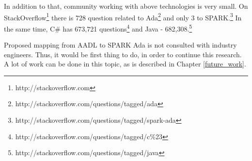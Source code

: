 In addition to that, community working with above technologies is very small. On StackOverflow\footnote{http://stackoverflow.com} there is 728 question related to Ada\footnote{http://stackoverflow.com/questions/tagged/ada} and only 3 to SPARK.\footnote{http://stackoverflow.com/questions/tagged/spark-ada} In the same time, C\# has 673,721 questions\footnote{http://stackoverflow.com/questions/tagged/c\%23} and Java - 682,308.\footnote{http://stackoverflow.com/questions/tagged/java}

Proposed mapping from AADL to SPARK Ada is not consulted with industry engineers. Thus, it would be first thing to do, in order to continue this research. A lot of work can be done in this topic, as is described in Chapter \ref{future_work}.